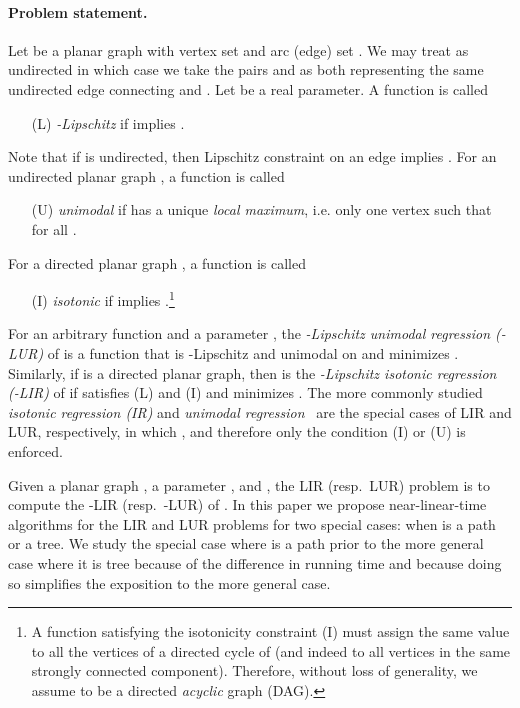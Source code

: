 \documentclass[11pt]{article}
\begin{document}
\paragraph{Problem statement.} 

Let  be a planar graph with vertex set  and arc (edge) set . We may treat  as undirected in which case we take the pairs  and  as both representing the same undirected edge connecting  and .
Let  be a real
parameter. A function  is called
\begin{itemize} 
\item [(L)]{\em -Lipschitz} if   implies .
\end{itemize}
Note that if  is undirected, then Lipschitz constraint on an edge  implies .  
For an undirected planar graph , a function 
 is called
\begin{itemize}
\item [(U)]{\em unimodal} if  has a unique {\em local maximum}, i.e. only one vertex  such that  for all .
\end{itemize}
For a directed planar graph , a function 
 is called
\begin{itemize}
\item [(I)]{\em isotonic} if  implies 
.\footnote{A function  satisfying the isotonicity constraint (I) must assign 
the same value to all the vertices of a directed cycle of  
(and indeed to all vertices in the same strongly connected component). 
Therefore, without loss of generality, we assume 
 to be a directed {\em acyclic} graph (DAG).}
\end{itemize}
For an arbitrary function  and a 
parameter , the {\em -Lipschitz unimodal regression 
(-LUR\/)} of  is a function  
that is -Lipschitz and unimodal on  and 
minimizes . 
Similarly, if  is a directed planar graph, then 
 is the {\em -Lipschitz isotonic regression 
(-LIR\/)} of  if  satisfies (L) and (I) and 
minimizes .
The more commonly studied {\em isotonic regression (IR)\/} and \emph{unimodal
regression}~\cite{AHKW06,ABERS55,BBBB72,Preparata:85} are the special cases of 
LIR and LUR, respectively, in which  , and therefore only the 
condition (I) or (U) is enforced.

Given a planar graph , a parameter , and 
, the LIR (resp.\ LUR) problem
is to compute the -LIR (resp.\ -LUR) of . In this 
paper we propose near-linear-time algorithms for the LIR and LUR problems
for two special cases: when  is a path or a tree. We study the special case where  is a path prior to the more general case where it is tree because of the difference in running time and because doing so simplifies the exposition to the more general case. 
\end{document}
